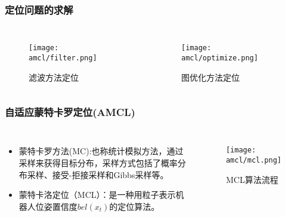 \begin{comment}
1.表示：贝叶斯网、马尔科夫网、因子图
2.推理：精确推理和近似推理
3.参数学习

1.最速下降：负梯度方向搜索，收敛速度慢。
2.Newton法：保留了泰勒展开的一阶和二阶项，二次收敛速度，但每步都需要计算法Hessian矩阵，复杂的高。
3.GN法：通过Jacobian矩阵近似H矩阵，提高了算法的效率，但H矩阵不满秩则无法迭代。
4.LM法：基于信赖域算法，解决H矩阵不满秩或非正定问题。

\end{comment}
\begin{frame}
  \frametitle{定位问题的求解}
  \centering
  \begin{columns}
    \begin{figure}
      \texttt{[image: amcl/filter.png]}
      \caption{滤波方法定位}
    \end{figure}
    \begin{figure}
      \texttt{[image: amcl/optimize.png]}
      \caption{图优化方法定位}
    \end{figure}
  \end{columns}


\end{frame}




\begin{comment}
蒙特卡罗方法也称统计模拟方法，通过采样来获得目标分布。从而将数值计算问题转化为概率统计的方法。
MCMC是很多算法求解的基础，在机器学习和强化学习都有广泛的应用

MC：解决难以用数值计算的问题转换为概率统计的方法

感知、定位、建图包含很深的理论。

MCMC采样
\end{comment}

\begin{frame}
  \frametitle{自适应蒙特卡罗定位(AMCL)}
  \begin{columns}
    \begin{itemize}
      \item 蒙特卡罗方法(MC):也称统计模拟方法，通过采样来获得目标分布，采样方式包括了{\color{red}概率分布采样}、接受-拒接采样和Gibbs采样等。
      \item 蒙特卡洛定位（MCL）：是一种用粒子表示机器人位姿置信度$bel(x_t)$的定位算法。
    \end{itemize}
    \begin{figure}
      \texttt{[image: amcl/mcl.png]}
      \caption{MCL算法流程}
    \end{figure}
  \end{columns}

\end{frame}

